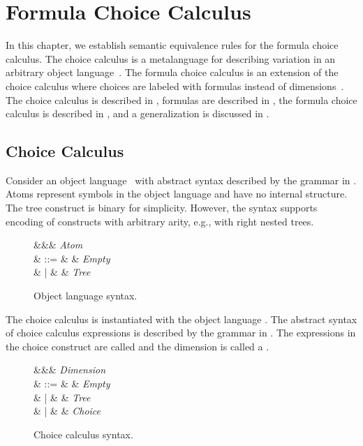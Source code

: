 \chapter{Formula Choice Calculus}
\label{ch:cc}

In this chapter, we establish semantic equivalence rules for the formula choice calculus.
The choice calculus is a metalanguage for describing variation in an arbitrary object language~\citep{EW11tosem}.
The formula choice calculus is an extension of the choice calculus where choices are labeled with formulas instead of dimensions~\citep{WO14gpce}.
The choice calculus is described in , formulas are described in , the formula choice calculus is described in , and a generalization is discussed in .

\section{Choice Calculus}
\label{sec:ccback}

\renewcommand*{\dimMeta}{\dE}

Consider an object language \objS\ with abstract syntax described by the grammar in .
Atoms represent symbols in the object language and have no internal structure.
The tree construct is binary for simplicity.
However, the syntax supports encoding of constructs with arbitrary arity, e.g., with right nested trees.

\begin{figure}[H]
  \onehalfspacing
  \begin{syntax}
    \aE \in \aS &&& \textit{Atom} \\
    \objE \in \objS
    & ::= & \objEmpty & \textit{Empty} \\
    & | & \tr{\objE, \objE} & \textit{Tree}
  \end{syntax}
  \caption{Object language syntax.}
  \label{fig:obj}
\end{figure}

The choice calculus is instantiated with the object language \objS.
The abstract syntax of choice calculus expressions is described by the grammar in .
The expressions in the choice construct are called  and the dimension is called a .

\begin{figure}[H]
  \onehalfspacing
  \begin{syntax}
    \dE \in \dS &&& \textit{Dimension} \\
    \ccE \in \ccS
    & ::= & \objEmpty & \textit{Empty} \\
    & | & \tr{\ccE, \ccE} & \textit{Tree} \\
    & | & \chc{\ccE, \ccE} & \textit{Choice}
  \end{syntax}
  \caption{Choice calculus syntax.}
  \label{fig:ccsyn}
\end{figure}


